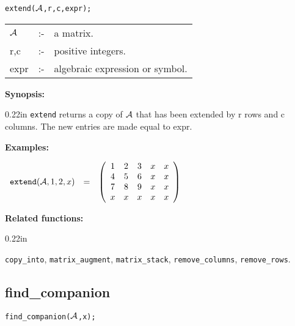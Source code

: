 
\hspace*{0.175in} {\tt extend(${\cal A}$,r,c,expr);}

\hspace*{0.1in}
\begin{tabular}{l l l}
${\cal A}$ &:-& a matrix. \\
r,c        &:-& positive integers. \\
expr      &:-& algebraic expression or symbol.
\end{tabular}

{\bf Synopsis:} %

\begin{addtolength}{\leftskip}{0.22in}
                {\tt extend} returns a copy of ${\cal A}$ that has been
                extended by r rows and c columns. The new entries are
                made equal to expr.

\end{addtolength}

{\bf Examples:}

\begin{flushleft}
\hspace*{0.1in}
\begin{math}
\begin{array}{ccc}
{\tt extend}({\cal A},1,2,x) & = &
\left( \begin{array}{ccccc} 1 & 2 & 3 & x & x \\ 4 & 5 & 6 & x & x
\\ 7 & 8 & 9 & x & x \\ x & x & x & x & x
\end{array} \right)
\end{array}
\end{math}
\end{flushleft}

{\bf Related functions:}

\begin{addtolength}{\leftskip}{0.22in}
\parbox[t]{0.95\linewidth}{{\tt copy\_into}, {\tt matrix\_augment},
{\tt matrix\_stack}, {\tt remove\_columns}, {\tt remove\_rows}.}

\end{addtolength}


\subsection{find\_companion}

\hspace*{0.175in} {\tt find\_companion(${\cal A}$,x);}

